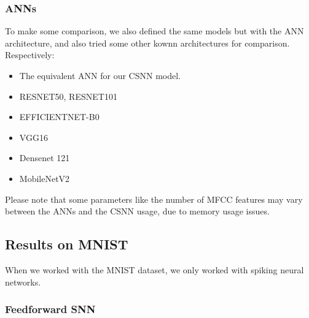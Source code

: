 \documentclass[11pt]{article}
\begin{document}
\subsubsection{ANNs}

To make some comparison, we also defined the same models but with the ANN architecture, and also tried some other kownn architectures for comparison. Respectively:

\begin{itemize}
  \item The equivalent ANN for our CSNN model.
  \item RESNET50, RESNET101
  \item EFFICIENTNET-B0
  \item VGG16
  \item Densenet 121
  \item MobileNetV2
\end{itemize}

Please note that some parameters like the number of MFCC features may vary between the ANNs and the CSNN usage, due to memory usage issues.

\pagebreak

\subsection{Results on MNIST}

When we worked with the MNIST dataset, we only worked with spiking neural networks.

\subsubsection*{Feedforward SNN}
\end{document}
